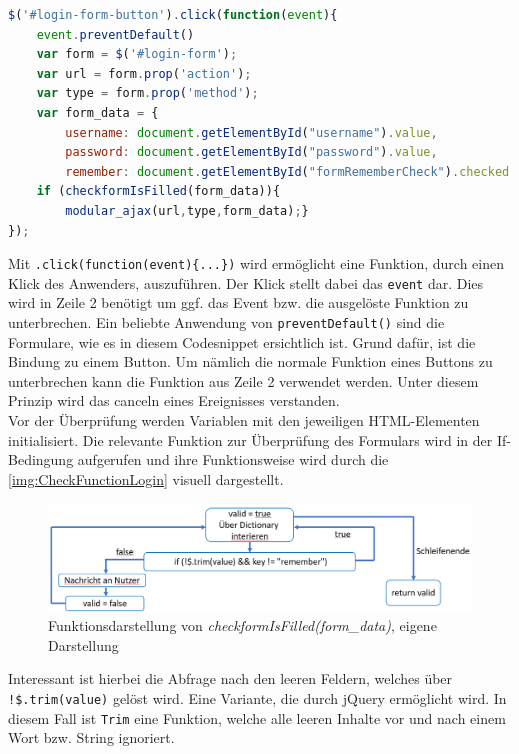 \documentclass[a4paper,titlepage,halfparskip,12pt]{scrreprt}
\begin{document}
\begin{onehalfspacing}
\begin{lstlisting}[language=Javascript,caption=Angehängte Funktion an ein HTML-Element,label={lst:JSLoginButton}]
$('#login-form-button').click(function(event){
	event.preventDefault()
	var form = $('#login-form');
	var url = form.prop('action');
	var type = form.prop('method');
	var form_data = {
		username: document.getElementById("username").value,
		password: document.getElementById("password").value,
		remember: document.getElementById("formRememberCheck").checked }
	if (checkformIsFilled(form_data)){
		modular_ajax(url,type,form_data);}
});
\end{lstlisting}
Mit \texttt{.click(function(event)\{...\})} wird ermöglicht eine Funktion, durch einen Klick des Anwenders, auszuführen. Der Klick stellt dabei das \texttt{event} dar. Dies wird in Zeile 2 benötigt um ggf. das Event bzw. die ausgelöste Funktion zu unterbrechen. Ein beliebte Anwendung von \texttt{preventDefault()} sind die Formulare, wie es in diesem Codesnippet ersichtlich ist. Grund dafür, ist die Bindung zu einem Button. Um nämlich die normale Funktion eines Buttons zu unterbrechen kann die Funktion aus Zeile 2 verwendet werden. Unter diesem Prinzip wird das \glqq canceln\grqq{} eines Ereignisses verstanden. \cite{w3schoolsPrevDefault}\\
Vor der Überprüfung werden Variablen mit den jeweiligen \ac{HTML}-Elementen initialisiert. Die relevante Funktion zur Überprüfung des Formulars wird in der If-Bedingung aufgerufen und ihre Funktionsweise wird durch die \autoref{img:CheckFunctionLogin} visuell dargestellt.%
\begin{figure}[h]
	\centering
	\includegraphics[scale=0.8]{images/FunktionUeberpruefenLogin}
	\caption{Funktionsdarstellung von \textit{checkformIsFilled(form\_data)}, eigene Darstellung}
	\label{img:CheckFunctionLogin}
\end{figure}
Interessant ist hierbei die Abfrage nach den leeren Feldern, welches über \texttt{!\$.trim(value)} gelöst wird. Eine Variante, die durch jQuery ermöglicht wird. In diesem Fall ist \texttt{Trim} eine Funktion, welche alle leeren Inhalte vor und nach einem Wort bzw. String ignoriert. \cite{jQueryTrim}\\ 

\end{onehalfspacing}
\end{document}
